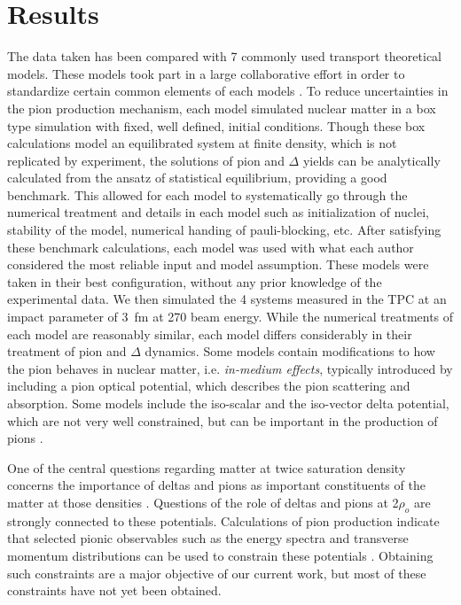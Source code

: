 \chapter{Results}

 The data taken has been compared with 7 commonly used transport theoretical models. These models took part in a large collaborative effort in order to standardize certain common elements of each models \cite{theoryComp1,theoryComp2}. To reduce uncertainties in the pion production mechanism, each model simulated nuclear matter in a box type simulation with fixed, well defined, initial conditions. Though these box calculations model an equilibrated system at finite density, which is  not replicated by experiment, the solutions  of  pion and $\Delta$ yields can be analytically calculated from the ansatz of statistical equilibrium, providing a good benchmark. This allowed for each model to systematically go through the numerical treatment and details in each model such as initialization of nuclei, stability of the model, numerical handing of pauli-blocking, etc. After satisfying these benchmark calculations, each model was used with what each author considered the most reliable input and model assumption.  These models were taken in their best configuration, without any prior knowledge of the experimental data. We then simulated the 4 systems measured in the \spirit TPC at an impact parameter of \SI{3}{\femto\metre} at \SI{270}{\MeVA} beam energy. While the numerical treatments of each model are reasonably similar, each model differs considerably in their treatment of pion and $\Delta$ dynamics. Some models contain modifications to how the pion behaves in nuclear matter, i.e. \emph{in-medium effects}, typically introduced by including a pion optical potential, which describes the pion scattering and absorption. Some models include the iso-scalar and the iso-vector delta potential, which are not very well constrained, but can be important in the production of pions \cite{baoan_deltapotential,inmedPionKo,inmedPionFeng}. 


One of the central questions regarding matter at twice saturation density concerns the importance of deltas and pions as important constituents of the matter at those densities \cite{pionNS,deltaNS,awayforward}. Questions of the role of deltas and pions at 2$\rho_o$ are strongly connected to these potentials. Calculations of pion production indicate that selected pionic observables such as the energy spectra and transverse momentum distributions can be used to constrain these potentials \cite{cozmaPC}. Obtaining such constraints are a major objective of our current work, but most of these constraints have not yet been obtained.

